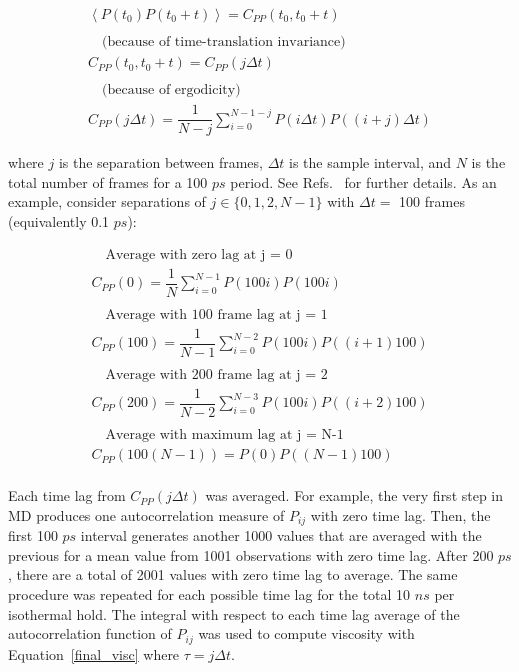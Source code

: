 \documentclass[11pt,a4paper]{article}                                %
\begin{document}
\begin{align}
    \left < P(t_{0})P(t_{0}+t)\right > = C_{PP}(t_{0}, t_{0}+t) \\
    \nonumber \\
    \quad\text{(because of time-translation invariance)} \nonumber \\
    C_{PP}(t_{0}, t_{0}+t) = C_{PP}(j \Delta t) \\
    \nonumber \\
    \quad\text{(because of ergodicity)} \nonumber \\
    C_{PP}(j \Delta t) = \dfrac{1}{N-j}\sum_{i=0}^{N-1-j}P(i \Delta t)P((i+j)\Delta t)
\end{align}

\par
where $j$ is the separation between frames, $\Delta t$ is the sample interval, and $N$ is the total number of frames for a 100 $ps$ period. See Refs.~\cite{chemtext, gromacs} for further details. As an example, consider separations of $j \in \{0, 1, 2, N-1\}$ with $\Delta t = $ 100 frames (equivalently 0.1 $ps$):

\begin{align*}
    \quad\text{Average with zero lag at j = 0} \\
    C_{PP}(0) = \dfrac{1}{N}\sum_{i=0}^{N-1}P(100i)P(100i) \\ 
    \\
    \quad\text{Average with 100 frame lag at j = 1} \\
    C_{PP}(100) = \dfrac{1}{N-1}\sum_{i=0}^{N-2}P(100i)P((i+1)100) \\
    \\
    \quad\text{Average with 200 frame lag at j = 2} \\
    C_{PP}(200) = \dfrac{1}{N-2}\sum_{i=0}^{N-3}P(100i)P((i+2)100) \\
    \\
    \quad\text{Average with maximum lag at j = N-1} \\
    C_{PP}(100(N-1)) = P(0)P((N-1)100) \\
\end{align*}

\par
Each time lag from $C_{PP}(j \Delta t)$ was averaged. For example, the very first step in MD produces one autocorrelation measure of $P_{ij}$ with zero time lag. Then, the first 100 $ps$ interval generates another 1000 values that are averaged with the previous for a mean value from 1001 observations with zero time lag. After 200 $ps$, there are a total of 2001 values with zero time lag to average. The same procedure was repeated for each possible time lag for the total 10 $ns$ per isothermal hold. The integral with respect to each time lag average of the autocorrelation function of $P_{ij}$ was used to compute viscosity with Equation~\ref{final_visc} where $\tau = j\Delta t$.
\end{document}
